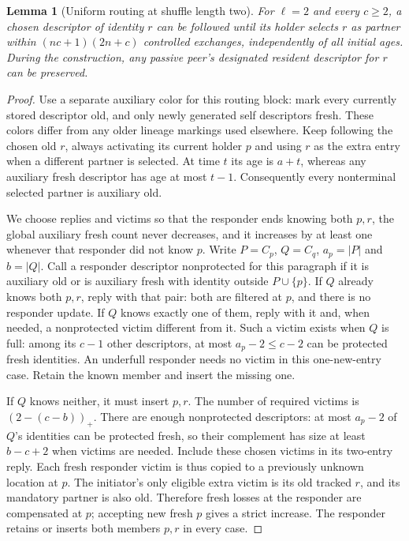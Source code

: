 \documentclass[11pt]{article}
\newtheorem{lemma}[theorem]{Lemma}
\begin{document}
\begin{lemma}[Uniform routing at shuffle length two]
\label{lem:tworouting}
For $\ell=2$ and every $c\ge2$, a chosen descriptor of identity
$r$ can be followed until its holder selects $r$ as partner
within $(nc+1)(2n+c)$ controlled exchanges, independently of
all initial ages. During the construction, any passive peer's
designated resident descriptor for $r$ can be preserved.
\end{lemma}
\begin{proof}
Use a separate auxiliary color for this routing block: mark
every currently stored descriptor old, and only newly generated
self descriptors fresh. These colors differ from any older
lineage markings used elsewhere. Keep following the chosen old
$r$, always activating its current holder $p$ and using $r$
as the extra entry when a different partner is selected.
At time $t$ its age is $a+t$, whereas any auxiliary fresh
descriptor has age at most $t-1$. Consequently every
nonterminal selected partner is auxiliary old.

We choose replies and victims so that the responder ends
knowing both $p,r$, the global auxiliary fresh count never
decreases, and it increases by at least one whenever that
responder did not know $p$.
Write $P=C_p$, $Q=C_q$, $a_p=|P|$ and $b=|Q|$.
Call a responder descriptor nonprotected for this paragraph
if it is auxiliary old or is auxiliary fresh with identity
outside $P\cup\{p\}$.
If $Q$ already knows both $p,r$, reply with that pair:
both are filtered at $p$, and there is no responder update.
If $Q$ knows exactly one of them, reply with it and, when
needed, a nonprotected victim different from it. Such a victim
exists when $Q$ is full: among its $c-1$ other descriptors,
at most $a_p-2\le c-2$ can be protected fresh identities.
An underfull responder needs no victim in this one-new-entry
case. Retain the known member and insert the missing one.

If $Q$ knows neither, it must insert $p,r$.
The number of required victims is $(2-(c-b))_+$.
There are enough nonprotected descriptors: at most $a_p-2$
of $Q$'s identities can be protected fresh, so their complement
has size at least $b-c+2$ when victims are needed.
Include these chosen victims in its two-entry reply.
Each fresh responder victim is thus copied to a previously
unknown location at $p$. The initiator's only eligible extra
victim is its old tracked $r$, and its mandatory partner is
also old. Therefore fresh losses at the responder are
compensated at $p$; accepting new fresh $p$ gives a strict
increase. The responder retains or inserts both members
$p,r$ in every case.


\end{proof}
\end{document}
